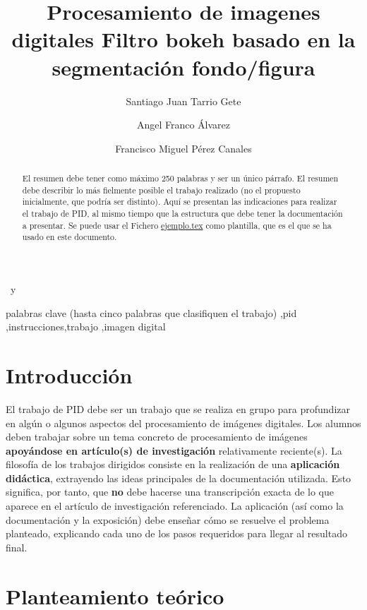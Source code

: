\documentclass{pid}
\begin{document}
\begin{frontmatter}

\title{Procesamiento de imagenes digitales } 
\title{Filtro bokeh basado en la segmentación fondo/figura}
\author{ Santiago Juan Tarrio Gete  }
\author{ Angel Franco Álvarez  }
\mbox{ y }
\author{Francisco Miguel Pérez Canales}
\maketitle

\begin{abstract}
\noindent
El resumen debe tener como máximo 250 palabras y ser un único párrafo. El resumen debe describir lo más fielmente posible el trabajo realizado (no el propuesto inicialmente, que podría ser distinto). Aquí se presentan las indicaciones para realizar el trabajo de PID, al mismo tiempo que la estructura que debe tener la documentación a presentar. Se puede usar el Fichero \url{ejemplo.tex} como plantilla, que es el que se ha usado en este documento.

\end{abstract}

\begin{keyword} palabras clave (hasta cinco palabras que clasifiquen el trabajo) \sep pid \sep instrucciones\sep trabajo \sep imagen digital \end{keyword}
\end{frontmatter}

\section{Introducción}

El trabajo de PID debe ser un trabajo que se realiza en grupo para profundizar en algún o algunos aspectos del procesamiento de imágenes digitales. Los alumnos deben trabajar sobre un tema concreto de procesamiento de imágenes {\bf apoyándose en artículo(s) de investigación} relativamente reciente(s).
La filosofía de los trabajos dirigidos consiste en la realización de una {\bf aplicación didáctica}, extrayendo las ideas principales de la documentación utilizada. Esto significa, por tanto, que {\bf no} debe hacerse una transcripción exacta de lo que aparece en el artículo de investigación referenciado. La aplicación (así como la documentación y la exposición) debe enseñar cómo se resuelve el problema planteado, explicando cada uno de los pasos requeridos para llegar al resultado final.

\section{Planteamiento teórico}
\end{document}

